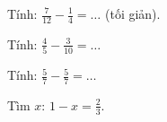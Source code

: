 \begin{ex}
Tính: $\frac{7}{12} - \frac{1}{4} = \dots$ (tối giản).
\end{ex}

\begin{ex}
Tính: $\frac{4}{5} - \frac{3}{10} = \dots$
\end{ex}

\begin{ex}
Tính: $\frac{5}{7} - \frac{5}{7} = \dots$
\end{ex}

\begin{ex}
Tìm $x$: $1 - x = \frac{2}{3}$.
\end{ex}
